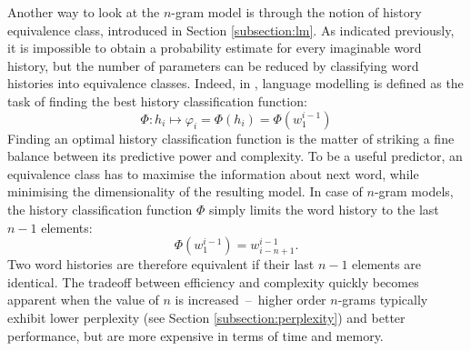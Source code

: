 Another way to look at the \mbox{$n$-gram} model is through the notion of history equivalence class, introduced in Section \ref{subsection:lm}. As indicated previously, it is impossible to obtain a probability estimate for every imaginable word history, but the number of parameters can be reduced by classifying word histories into equivalence classes. Indeed, in \cite{jelinek1997statistical}, language modelling is defined as the task of finding the best history classification function:
\begin{equation}
	\Phi:h_{i}\mapsto\varphi_{i}=\Phi(h_{i})=\Phi(w_{1}^{i-1})
\end{equation}
Finding an optimal history classification function is the matter of striking a fine balance between its predictive power and complexity. To be a useful predictor, an equivalence class has to maximise the information about next word, while minimising the dimensionality of the resulting model. In case of \mbox{$n$-gram} models, the history classification function $\Phi$ simply limits the word history to the last $n-1$ elements:
\begin{equation}
	\Phi(w_{1}^{i-1})=w_{i-n+1}^{i-1}.
\end{equation}
Two word histories are therefore equivalent if their last $n-1$ elements are identical. The tradeoff between efficiency and complexity quickly becomes apparent when the value of $n$ is \mbox{increased~--~higher} order \mbox{$n$-gram}s typically exhibit lower perplexity (see Section \ref{subsection:perplexity}) and better performance, but are more expensive in terms of time and memory.
